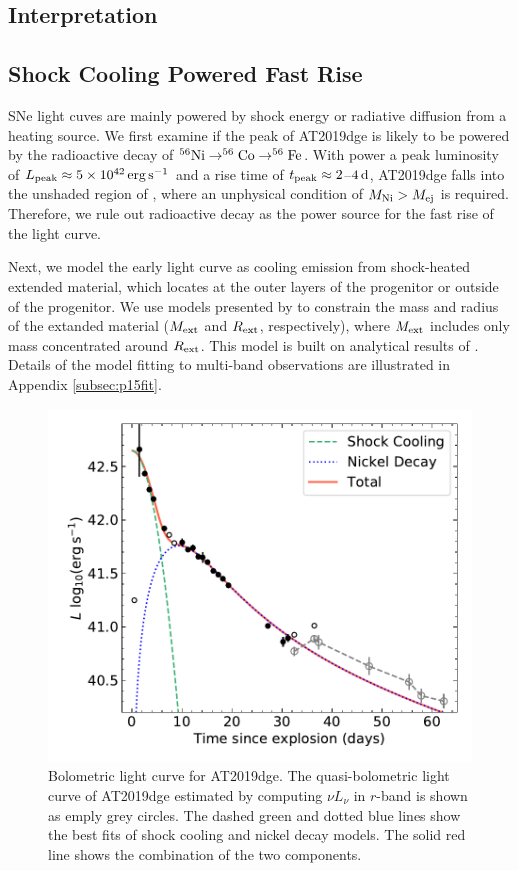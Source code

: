 \documentclass[twocolumn]{aastex63}
\begin{document}
\begin{CJK*}{UTF8}{gbsn}
\section{Interpretation}
\subsection{Shock Cooling Powered Fast Rise} \label{subsec:fastrise}
SNe light cuves are mainly powered by shock energy or radiative diffusion from a heating 
source. We first examine if the peak of AT2019dge is likely to be powered by the radioactive decay of 
$^{56}\rm Ni \rightarrow ^{56}Co \rightarrow ^{56}Fe$. With power a peak luminosity of $L_{\rm 
peak}\approx 5\times 10^{42}\,{\rm erg \, s^{-1}}$ and a rise time of  $t_{\rm peak}\approx 2$--$4\,{\rm 
d}$, AT2019dge falls into the unshaded region of \citet[][Fig.~1]{Kasen2017}, where an unphysical 
condition of $M_{\rm Ni} > M_{\rm ej}$ is required. Therefore, we rule out radioactive decay as the 
power source for the fast rise of the light curve.

Next, we model the early light curve as cooling emission from shock-heated extended material, which 
locates at the outer layers of the progenitor or outside of the progenitor. We use models presented by 
\citet[][hereafter P15]{Piro2015} to constrain the mass and radius of the extanded material ($M_{\rm 
ext}$ and $R_{\rm ext}$, respectively), where $M_{\rm ext}$ includes only mass concentrated around 
$R_{\rm ext}$. This model is built on analytical results of \citet{Nakar2014}. Details of the model fitting 
to multi-band observations are illustrated in Appendix \ref{subsec:p15fit}. 
\begin{figure}
	\centering
	\includegraphics[width=\columnwidth]{figures/Lbb.pdf}
	\caption{Bolometric light curve for AT2019dge. The quasi-bolometric light curve of AT2019dge 
	estimated by computing $\nu L_\nu$ in $r$-band is shown as emply grey circles. The dashed green 
	and dotted blue lines show the best fits of shock cooling and nickel decay models. The solid red line 
	shows the combination of the two components.}
	\label{fig:Lbb}
\end{figure}


\end{CJK*}
\end{document}
